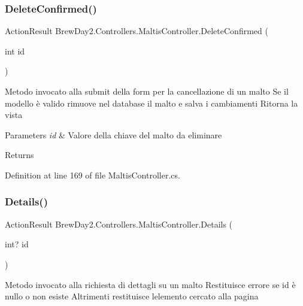 \subsubsection{\texorpdfstring{Delete\+Confirmed()}{DeleteConfirmed()}}
{\footnotesize\ttfamily Action\+Result Brew\+Day2.\+Controllers.\+Maltis\+Controller.\+Delete\+Confirmed (\begin{DoxyParamCaption}\item[{int}]{id }\end{DoxyParamCaption})}



Metodo invocato alla submit della form per la cancellazione di un malto Se il modello è valido rimuove nel database il malto e salva i cambiamenti Ritorna la vista 


\begin{DoxyParams}{Parameters}
{\em id} & Valore della chiave del malto da eliminare\\
\hline
\end{DoxyParams}
\begin{DoxyReturn}{Returns}

\end{DoxyReturn}


Definition at line 169 of file Maltis\+Controller.\+cs.

\mbox{\label{class_brew_day2_1_1_controllers_1_1_maltis_controller_aedb5d2ed75c992906e8dd87cca2d979a}} 
\subsubsection{\texorpdfstring{Details()}{Details()}}
{\footnotesize\ttfamily Action\+Result Brew\+Day2.\+Controllers.\+Maltis\+Controller.\+Details (\begin{DoxyParamCaption}\item[{int?}]{id }\end{DoxyParamCaption})}



Metodo invocato alla richiesta di dettagli su un malto Restituisce errore se id è nullo o non esiste Altrimenti restituisce l\textquotesingle{}elemento cercato alla pagina 


